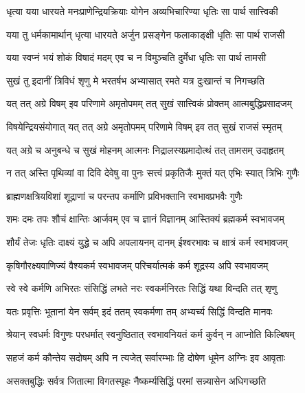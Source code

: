 \twolineshloka
{धृत्या यया धारयते मनःप्राणेन्द्रियक्रियाः}
{योगेन अव्यभिचारिण्या धृतिः सा पार्थ सात्त्विकी}%

\twolineshloka
{यया तु धर्मकामार्थान् धृत्या धारयते अर्जुन}
{प्रसङ्गेन फलाकाङ्क्षी धृतिः सा पार्थ राजसी}%

\twolineshloka
{यया स्वप्नं भयं शोकं विषादं मदम् एव च}
{न विमुञ्चति दुर्मेधा धृतिः सा पार्थ तामसी}%

\twolineshloka
{सुखं तु इदानीं त्रिविधं शृणु मे भरतर्षभ}
{अभ्यासात् रमते यत्र दुःखान्तं च निगच्छति}%

\twolineshloka
{यत् तत् अग्रे विषम् इव परिणामे अमृतोपमम्}
{तत् सुखं सात्त्विकं प्रोक्तम् आत्मबुद्धिप्रसादजम्}%

\twolineshloka
{विषयेन्द्रियसंयोगात् यत् तत् अग्रे अमृतोपमम्}
{परिणामे विषम् इव तत् सुखं राजसं स्मृतम्}%

\twolineshloka
{यत् अग्रे च अनुबन्धे च सुखं मोहनम् आत्मनः}
{निद्रालस्यप्रमादोत्थं तत् तामसम् उदाहृतम्}%

\twolineshloka
{न तत् अस्ति पृथिव्यां वा दिवि देवेषु वा पुनः}
{सत्त्वं प्रकृतिजैः मुक्तं यत् एभिः स्यात् त्रिभिः गुणैः}%

\twolineshloka
{ब्राह्मणक्षत्रियविशां शूद्राणां च परन्तप}
{कर्माणि प्रविभक्तानि स्वभावप्रभवैः गुणैः}%

\twolineshloka
{शमः दमः तपः शौचं क्षान्तिः आर्जवम् एव च}
{ज्ञानं विज्ञानम् आस्तिक्यं ब्रह्मकर्म स्वभावजम्}%

\twolineshloka
{शौर्यं तेजः धृतिः दाक्ष्यं युद्धे च अपि अपलायनम्}
{दानम् ईश्वरभावः च क्षात्रं कर्म स्वभावजम्}%

\twolineshloka
{कृषिगौरक्ष्यवाणिज्यं वैश्यकर्म स्वभावजम्}
{परिचर्यात्मकं कर्म शूद्रस्य अपि स्वभावजम्}%

\twolineshloka
{स्वे स्वे कर्मणि अभिरतः संसिद्धिं लभते नरः}
{स्वकर्मनिरतः सिद्धिं यथा विन्दति तत् शृणु}%

\twolineshloka
{यतः प्रवृत्तिः भूतानां येन सर्वम् इदं ततम्}
{स्वकर्मणा तम् अभ्यर्च्य सिद्धिं विन्दति मानवः}%

\twolineshloka
{श्रेयान् स्वधर्मः विगुणः परधर्मात् स्वनुष्ठितात्}
{स्वभावनियतं कर्म कुर्वन् न आप्नोति किल्बिषम्}%

\twolineshloka
{सहजं कर्म कौन्तेय सदोषम् अपि न त्यजेत्}
{सर्वारम्भाः हि दोषेण धूमेन अग्निः इव आवृताः}%

\twolineshloka
{असक्तबुद्धिः सर्वत्र जितात्मा विगतस्पृहः}
{नैष्कर्म्यसिद्धिं परमां सन्न्यासेन अधिगच्छति}%

